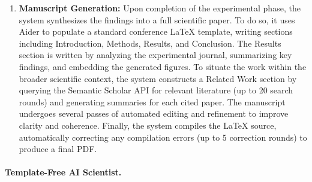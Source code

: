 \begin{enumerate}
    \item \textbf{Manuscript Generation:} Upon completion of the experimental phase, the system synthesizes the findings into a full scientific paper. To do so, it uses Aider to populate 
    a standard conference \LaTeX{} template, writing sections including Introduction, Methods, Results, and Conclusion. The Results section is written by analyzing the experimental journal, summarizing key findings, and embedding the generated figures. To situate the work within the broader scientific context, the system constructs a Related Work section by querying the Semantic Scholar API for relevant literature (up to 20 search rounds) and generating summaries for each cited paper. The manuscript undergoes several passes of automated editing and refinement to improve clarity and coherence. Finally, the system compiles the \LaTeX{} source, automatically correcting any compilation errors (up to 5 correction rounds) to produce a final PDF.
\end{enumerate}

\paragraph{Template-Free AI Scientist.}
\label{subsec:template-free-method}

